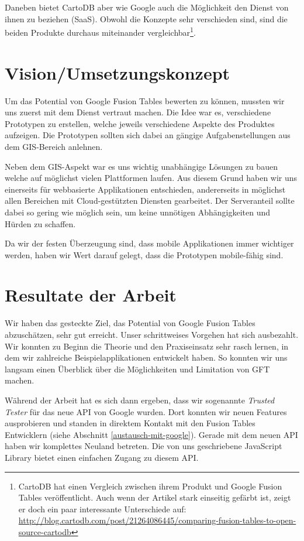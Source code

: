 Daneben bietet CartoDB aber wie Google auch die Möglichkeit den Dienst von ihnen zu beziehen (\gls{SaaS}). Obwohl  die Konzepte sehr verschieden sind, sind die beiden Produkte durchaus miteinander vergleichbar\footnote{CartoDB hat einen Vergleich zwischen ihrem Produkt und Google Fusion Tables veröffentlicht. Auch wenn der Artikel stark einseitig gefärbt ist, zeigt er doch ein paar interessante Unterschiede auf: \url{http://blog.cartodb.com/post/21264086445/comparing-fusion-tables-to-open-source-cartodb}}.

\section{Vision/Umsetzungskonzept}
Um das Potential von Google Fusion Tables bewerten zu können, mussten wir uns zuerst mit dem Dienst vertraut machen. Die Idee war es, verschiedene Prototypen zu erstellen, welche jeweils verschiedene Aspekte des Produktes aufzeigen. Die Prototypen sollten sich dabei an gängige Aufgabenstellungen aus dem \gls{GIS}-Bereich anlehnen.

Neben dem \gls{GIS}-Aspekt war es uns wichtig unabhängige Lösungen zu bauen welche auf möglichst vielen Plattformen laufen. Aus diesem Grund haben wir uns einerseits für webbasierte Applikationen entschieden, andererseits in möglichst allen Bereichen mit \gls{Cloud}-gestützten Diensten gearbeitet. Der Serveranteil sollte dabei so gering wie möglich sein, um keine unnötigen Abhängigkeiten und Hürden zu schaffen.

Da wir der festen Überzeugung sind, dass mobile Applikationen immer wichtiger werden, haben wir Wert darauf gelegt, dass die Prototypen mobile-fähig sind. 

\section{Resultate der Arbeit}
Wir haben das gesteckte Ziel, das Potential von Google Fusion Tables abzuschätzen, sehr gut erreicht. Unser schrittweises Vorgehen hat sich ausbezahlt. Wir konnten zu Beginn die Theorie und den Praxiseinsatz sehr rasch lernen, in dem wir zahlreiche Beispielapplikationen entwickelt haben. So konnten wir uns langsam einen Überblick über die Möglichkeiten und Limitation von GFT machen.

Während der Arbeit hat es sich dann ergeben, dass wir sogenannte \emph{Trusted Tester} für das neue API von Google wurden. Dort konnten wir neuen Features ausprobieren und standen in direktem Kontakt mit den Fusion Tables Entwicklern (siehe Abschnitt \ref{austausch-mit-google}). Gerade mit dem neuen API haben wir komplettes Neuland betreten. Die von uns geschriebene JavaScript Library bietet einen einfachen Zugang zu diesem API.

